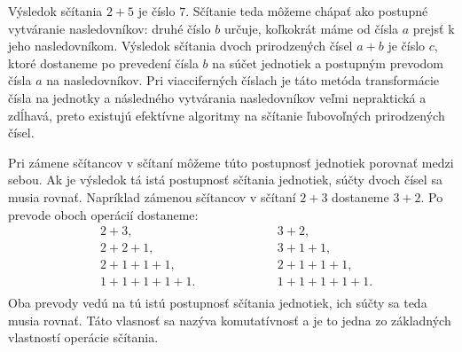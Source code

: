 \documentclass{article}
\begin{document}
Výsledok sčítania \(2 + 5\) je číslo \(7\). Sčítanie teda môžeme chápať ako postupné vytváranie nasledovníkov: druhé číslo \(b\) určuje, koľkokrát máme od čísla \(a\) prejsť k jeho nasledovníkom. Výsledok sčítania dvoch prirodzených čísel \(a + b\) je číslo \(c\), ktoré dostaneme po prevedení čísla \(b\) na súčet jednotiek a postupným prevodom čísla \(a\) na nasledovníkov. Pri viacciferných číslach je táto metóda transformácie čísla na jednotky a následného vytvárania nasledovníkov veľmi nepraktická a zdĺhavá, preto existujú efektívne algoritmy na sčítanie ľubovoľných prirodzených čísel.

Pri zámene sčítancov v sčítaní môžeme túto postupnosť jednotiek porovnať medzi sebou. Ak je výsledok tá istá postupnosť sčítania jednotiek, súčty dvoch čísel sa musia rovnať. Napríklad zámenou sčítancov v sčítaní \(2 + 3\) dostaneme \(3 + 2\). Po prevode oboch operácií dostaneme:
\[
\begin{aligned}
  &2 + 3, \\
  &2 + 2 + 1, \\
  &2 + 1 + 1 + 1, \\
  &1 + 1 + 1 + 1 + 1. \\
\end{aligned}
\hspace{5em}
\begin{aligned}
  &3 + 2, \\
  &3 + 1 + 1, \\
  &2 + 1 + 1 + 1, \\
  &1 + 1 + 1 + 1 + 1. \\
\end{aligned}
\]
Oba prevody vedú na tú istú postupnosť sčítania jednotiek, ich súčty sa teda musia rovnať. Táto vlasnosť sa nazýva komutatívnosť a je to jedna zo základných vlastností operácie sčítania.
\end{document}
